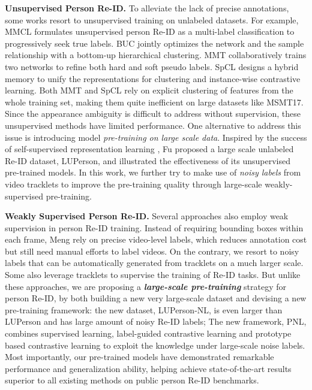 \documentclass[10pt,twocolumn,letterpaper]{article}
\begin{document}
\noindent\textbf{Unsupervised Person Re-ID.}
To alleviate the lack of precise annotations, some works resort to unsupervised training on unlabeled datasets.
For example, MMCL \cite{wang2020unsupervised} formulates unsupervised person Re-ID as a multi-label classification to progressively seek true labels. BUC \cite{lin2019bottom} jointly optimizes the network and the sample relationship with a bottom-up hierarchical clustering.
MMT \cite{ge2019mutual} collaboratively trains two networks to refine both hard and soft pseudo labels.
SpCL \cite{ge2020selfpaced} designs a hybrid memory to unify the representations for clustering and instance-wise contrastive learning.
Both MMT \cite{ge2019mutual} and SpCL \cite{ge2020selfpaced} rely on explicit clustering of features from the whole training set, making them quite inefficient on large datasets like MSMT17.
Since the appearance ambiguity is difficult to address without supervision, these unsupervised methods have limited performance.
One alternative to address this issue is introducing model \emph{pre-training on large scale data}.
Inspired by the success of self-supervised representation learning \cite{wu2018unsupervised,he2020momentum,chen2020simple,chen2020big,chen2020mocov2,grill2020bootstrap,li2020mopro}, Fu \etal \cite{fu2020unsupervised} proposed a large scale unlabeled Re-ID dataset, LUPerson, and illustrated the effectiveness of its unsupervised pre-trained models.
In this work, we further try to make use of \emph{noisy labels} from video tracklets to improve the pre-training quality through large-scale weakly-supervised pre-training. 

\noindent\textbf{Weakly Supervised Person Re-ID.}
Several approaches also employ weak supervision in person Re-ID training.
Instead of requiring bounding boxes within each frame, Meng \etal \cite{meng2019weakly} rely on precise video-level labels, which reduces annotation cost but still need manual efforts to label videos.
On the contrary, we resort to noisy labels that can be automatically generated from tracklets on a much larger scale.
Some \cite{li2019unsupervised,wang2020weakly,chen2019weakly} also leverage tracklets to supervise the training of Re-ID tasks.
But unlike these approaches, we are proposing a \textbf{\emph{large-scale pre-training}} strategy for person Re-ID, by both building a new very large-scale dataset and devising a new pre-training framework:
the new dataset, LUPerson-NL, is even larger than LUPerson \cite{fu2020unsupervised} and has large amount of noisy Re-ID labels;
The new framework, PNL, combines supervised learning, label-guided contrastive learning and prototype based contrastive learning to exploit the knowledge under large-scale noise labels. 
Most importantly, our pre-trained models have demonstrated remarkable performance and generalization ability, 
helping achieve state-of-the-art results superior to all existing methods on public person Re-ID benchmarks. 
\end{document}
